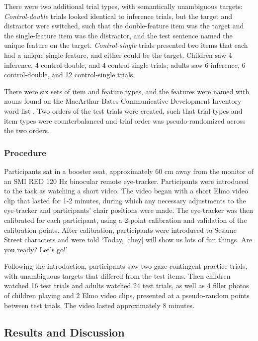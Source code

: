 \documentclass[10pt,letterpaper]{article}
\begin{document}
There were two additional trial types, with semantically unambiguous targets: \emph{Control-double} trials looked identical to inference trials, but the target and distractor were switched, such that the double-feature item was the target and the single-feature item was the distractor, and the test sentence named the unique feature on the target. \emph{Control-single} trials presented two items that each had a unique single feature, and either could be the target. Children saw 4 inference, 4 control-double, and 4 control-single trials; adults saw 6 inference, 6 control-double, and 12 control-single trials. 

There were six sets of item and feature types, and the features were named with nouns found on the  MacArthur-Bates Communicative Development Inventory word list \cite{fenson1994variability}. Two orders of the test trials were created, such that trial types and item types were counterbalanced and trial order was pseudo-randomized across the two orders.

\subsubsection{Procedure}

Participants sat in a booster seat, approximately 60 cm away from the monitor of an SMI RED 120 Hz binocular remote eye-tracker. Participants were introduced to the task as watching a short video. The video began with a short Elmo video clip that lasted for 1-2 minutes, during which any necessary adjustments to the eye-tracker and participants' chair positions were made. The eye-tracker was then calibrated for each participant, using a 2-point calibration and validation of the calibration points. After calibration, participants were introduced to Sesame Street characters and were told `Today, [they] will show us lots of fun things. Are you ready? Let's go!'

Following the introduction, participants saw two gaze-contingent practice trials, with unambiguous targets that differed from the test items. Then children watched 16 test trials and adults watched 24 test trials, as well as 4 filler photos of children playing and 2 Elmo video clips, presented at a pseudo-random points between test trials. The video lasted approximately 8 minutes.

\subsection{Results and Discussion}
\end{document}
